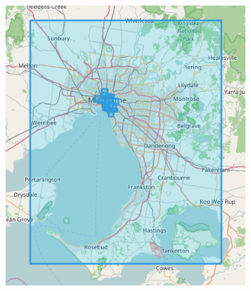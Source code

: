 \begin{figure}[!htbp]
\begin{subfigure}[htbp]{0.3\textwidth}
	\end{subfigure}
	\quad
	\begin{subfigure}[htbp]{0.3\textwidth}
		\centering
		\includegraphics[width=1\linewidth]{figures/melbourne_bbs.png}
		\caption{}
		\label{subfig:melbourne_bounding_boxes}
	\end{subfigure}
	
	\medskip
	

\end{figure}
